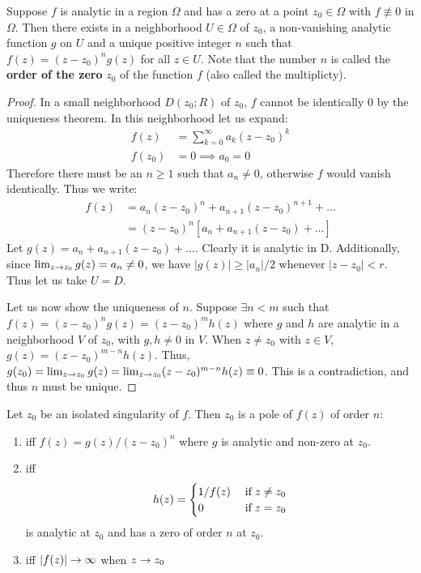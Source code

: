 \begin{lemma}
    Suppose $f$ is analytic in a region $\Omega$ and has a zero at a point $z_0\in\Omega$ with $f\not\equiv0$ in $\Omega$. Then there exists in a neighborhood $U\in\Omega$ of $z_0$, a non-vanishing
    analytic function $g$ on $U$ and a unique positive integer $n$ such that $f(z)=(z-z_0)^ng(z)$ for all $z\in U$. Note that the number $n$ is called the \textbf{order of the zero} $z_0$
    of the function $f$ (also called the multiplicty).
\end{lemma}
\begin{proof}
    In a small neighborhood $D(z_0; R)$ of $z_0$, $f$  cannot be identically 0 by the uniqueness theorem. In this neighborhood let us expand:
    \begin{align*}
        f(z)&=\sum_{k=0}^\infty a_k(z-z_0)^k\\
        f(z_0)&=0 \implies a_0=0
    \end{align*}
    Therefore there must be an $n\geq 1$ such that $a_n\neq 0$, otherwise $f$ would vanish identically. Thus we write:
    \begin{align*}
        f(z)&=a_n(z-z_0)^n+a_{n+1}(z-z_0)^{n+1}+\dots\\
        &=(z-z_0)^n\left[ a_n+a_{n+1}(z-z_0)+\dots \right]
    \end{align*}
    Let $g(z)=a_n+a_{n+1}(z-z_0)+\dots$. Clearly it is analytic in D. Additionally, since $\lim_{z\rightarrow z_0} g(z)=a_n\neq0$, we have
        $|g(z)|\geq|a_n|/2$
    whenever $|z-z_0|<r$. Thus let us take $U=D$.

    Let us now show the uniqueness of $n$. Suppose $\exists n<m$ such that $f(z)=(z-z_0)^ng(z)=(z-z_0)^mh(z)$ where $g$ and $h$ are analytic in a neighborhood $V$ of $z_0$, with
    $g, h\neq 0$ in $V$. When $z\neq z_0$ with $z\in V$, $g(z)=(z-z_0)^{m-n} h(z)$. Thus, $g(z_0)=\lim_{z\rightarrow z_0}g(z)=\lim_{z\rightarrow z_0}(z-z_0)^{m-n} h(z)\equiv 0$. This is a contradiction,
    and thus $n$ must be unique.
\end{proof}

\begin{thm}
   Let $z_0$ be an isolated singularity of $f$. Then $z_0$ is a pole of $f(z)$ of order $n$:
   \begin{enumerate}
       \item iff $f(z)=g(z)/(z-z_0)^n$ where $g$ is analytic and non-zero at $z_0$.
       \item iff 
           \begin{equation*}
               h(z)=
               \begin{cases}
                   1/f(z) & \;\textnormal{if}\; z\neq z_0\\
                   0 & \;\textnormal{if}\; z=z_0
               \end{cases}
           \end{equation*}
           is analytic at $z_0$ and has a zero of order $n$ at $z_0$.
       \item iff $|f(z)|\rightarrow \infty$ when $z\rightarrow z_0$
   \end{enumerate}
\end{thm}

